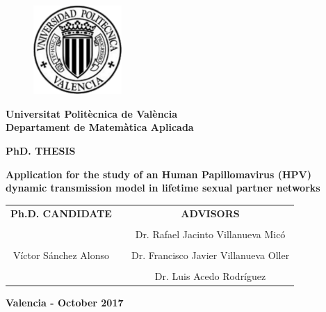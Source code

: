 \thispagestyle{empty}

\begin{figure}[h]
  	\centering
  	 \includegraphics[width=0.3\textwidth]{IMG/escudo_upv_transp.pdf}
\end{figure}
\begin{center}
\textbf{\normalsize Universitat Polit\`{e}cnica de Val\`{e}ncia}\\
\textbf{\normalsize Departament de Matem\`{a}tica Aplicada}

\vspace{2cm}

\scriptsize{\textbf{PhD. THESIS}}

\vspace{0.5cm}

\begin{center}
\textbf{\Huge Application for the study of an Human Papillomavirus (HPV) dynamic transmission model in lifetime sexual partner networks}
\end{center}

\vspace{3cm}

\begin{tabular}{ccc}
\textbf{Ph.D. CANDIDATE} 				& \hspace{0.7cm} &\textbf{ADVISORS} \\
 										& \hspace{0.7cm} &\\
 										& \hspace{0.7cm} &\normalsize{Dr. Rafael Jacinto Villanueva Mic\'{o} \hfill } \\ 
										& \hspace{0.7cm} &\\
\normalsize{V\'{i}ctor S\'{a}nchez Alonso} 	& \hspace{0.7cm} &\normalsize{Dr. Francisco Javier Villanueva Oller \hfill} \\ 
										& \hspace{0.7cm} &\\
 										& \hspace{0.7cm} &\normalsize{Dr. Luis Acedo Rodr\'{i}guez \hfill} \\ 
\end{tabular} 

\vspace{2cm}

\normalsize{\textbf{Valencia - October 2017}}

\end{center}
